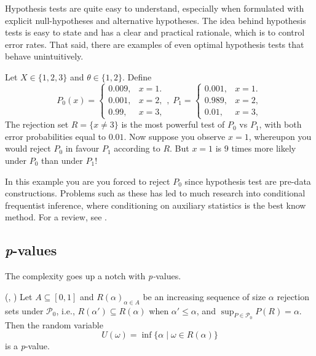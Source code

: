 Hypothesis tests are quite easy to understand, especially when formulated with explicit null-hypotheses and alternative hypotheses. The idea behind hypothesis tests is easy to state and has a clear and practical rationale, which is to control error rates. That said, there are examples of even optimal hypothesis tests that behave unintuitively. 

\begin{example}
 Let $X\in\{1,2,3\}$ and $\theta\in\{1,2\}$. Define
\[
P_{0}(x)=\begin{cases}
0.009, & x=1.\\
0.001, & x=2,\\
0.99, & x=3,
\end{cases},\;P_{1}=\begin{cases}
0.001, & x=1.\\
0.989, & x=2,\\
0.01, & x=3,
\end{cases}
\]
The rejection set $R=\{x\neq3\}$ is the most powerful test of $P_{0}$ vs $P_{1}$, with both error probabilities equal to $0.01$. Now suppose you observe $x=1$, whereupon you would reject $P_{0}$ in favour $P_{1}$ according to $R$. But $x=1$ is $9$ times more likely under $P_{0}$ than under $P_{1}$!
\end{example}

In this example you are you forced to reject $P_0$ since hypothesis test are pre-data constructions. Problems such as these has led to much research into conditional frequentist inference, where conditioning on auxiliary statistics is the best know method. For a review, see \textcite{Goutis1995-ga}.

\subsection{\textit{p}-values}
The complexity goes up a notch with \emph{p-}values.
\begin{definition}
\label{def:p-value}(\textcite[][Chapter 3.3]{Lehmann2005-sp}, \textcite{Bayarri2000-dt}) Let
$A\subseteq[0,1]$ and $R(\alpha)_{\alpha \in A}$ be an increasing sequence of size
$\alpha$ rejection sets under $\mathcal{P}_{0}$, i.e., $R(\alpha')\subseteq R(\alpha)$
when $\alpha'\leq\alpha$, and $\sup_{P\in\mathcal{P}_{0}}P(R)=\alpha$.
Then the random variable
\begin{equation}
U(\omega)=\inf\{\alpha\mid\omega\in R(\alpha)\}\label{eq:size p-value}
\end{equation}
is a \emph{p}-value. 
\end{definition}

